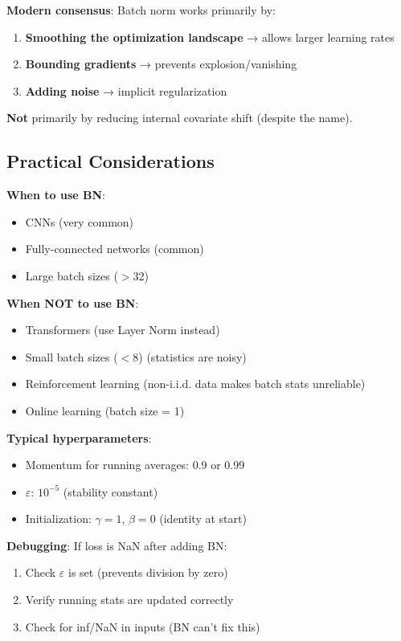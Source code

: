 \documentclass[11pt,oneside]{book}
\begin{document}
\textbf{Modern consensus}: Batch norm works primarily by:
\begin{enumerate}
\item \textbf{Smoothing the optimization landscape} → allows larger learning rates
\item \textbf{Bounding gradients} → prevents explosion/vanishing
\item \textbf{Adding noise} → implicit regularization
\end{enumerate}

\textbf{Not} primarily by reducing internal covariate shift (despite the name).

\subsection{Practical Considerations}

\textbf{When to use BN}:
\begin{itemize}
\item CNNs (very common)
\item Fully-connected networks (common)
\item Large batch sizes ($>$32)
\end{itemize}

\textbf{When NOT to use BN}:
\begin{itemize}
\item Transformers (use Layer Norm instead)
\item Small batch sizes ($<$8) (statistics are noisy)
\item Reinforcement learning (non-i.i.d. data makes batch stats unreliable)
\item Online learning (batch size = 1)
\end{itemize}

\textbf{Typical hyperparameters}:
\begin{itemize}
\item Momentum for running averages: 0.9 or 0.99
\item $\varepsilon$: $10^{-5}$ (stability constant)
\item Initialization: $\gamma = 1$, $\beta = 0$ (identity at start)
\end{itemize}

\textbf{Debugging}: If loss is NaN after adding BN:
\begin{enumerate}
\item Check $\varepsilon$ is set (prevents division by zero)
\item Verify running stats are updated correctly
\item Check for inf/NaN in inputs (BN can't fix this)
\end{enumerate}
\end{document}
